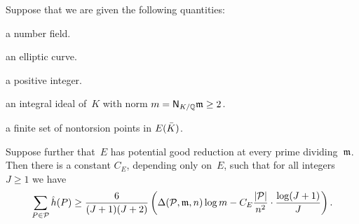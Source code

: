 \documentclass[12pt,reqno]{amsart}
\begin{document}
\begin{theorem}
\label{thm:sumhhatPgeD}
Suppose that we are given the following quantities\textup:
\begin{notation}
\item[$K/\QQ$]
a number field.
\item[$E/K$]
an elliptic curve.
\item[$n$]
a positive integer.
\item[$\gm$]
an integral ideal of~$K$ with norm $m={\operatorname{\mathsf{N}}}_{K/\mathbb{Q}}{\mathfrak{m}}\ge2$.
\item[$\Pcal$]
a finite set of nontorsion points in $E({\bar K})$.
\end{notation}
Suppose further that~$E$ has potential good reduction at every prime
dividing~$\gm$. Then there is a constant $C_E$, depending only on~$E$,
such that for all integers~$J\ge1$ we have
\[
  \sum_{P\in{\mathcal P}} {\hat h}(P) \ge
  \frac{6}{(J+1)(J+2)}\left(\Delta({\mathcal P},{\mathfrak{m}},n)\log m -C_E
  \frac{|{\mathcal P}|}{n^2}\cdot\frac{\log(J+1)}{J}\right).
\]
\end{theorem}
\end{document}
